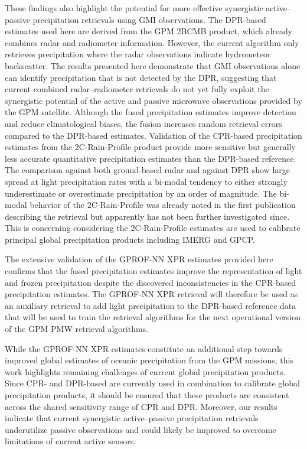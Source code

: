 \documentclass{ametsocV6.1}
\begin{document}
These findings also highlight the potential for more effective synergistic
active–passive precipitation retrievals using GMI observations. The DPR-based
estimates used here are derived from the GPM 2BCMB product, which already
combines radar and radiometer information. However, the current algorithm only
retrieves precipitation where the radar observations indicate hydrometeor
backscatter. The results presented here demonstrate that GMI observations alone
can identify precipitation that is not detected by the DPR, suggesting that
current combined radar–radiometer retrievals do not yet fully exploit the
synergistic potential of the active and passive microwave observations provided
by the GPM satellite. Although the fused precipitation estimates improve
detection and reduce climatological biases, the fusion increases random
retrieval errors compared to the DPR-based estimates. Validation of the
CPR-based precipitation estimates from the 2C-Rain-Profile product provide more
sensitive but generally less accurate quantitative precipitation estimates than
the DPR-based reference. The comparison against both ground-based radar and
against DPR show large spread at light precipitation rates with a bi-modal
tendency to either strongly underestimate or overestimate precipitation by an
order of magnitude. The bi-modal behavior of the 2C-Rain-Profile was already
noted in the first publication describing the retrieval but apparently has not
been further investigated since. This is concerning considering the
2C-Rain-Profile estimates are used to calibrate principal global precipitation
products including IMERG and GPCP.

The extensive validation of the GPROF-NN XPR estimates provided here confirms
that the fused precipitation estimates improve the representation of light and
frozen precipitation despite the discovered inconsistencies in the CPR-based
precipitation estimates. The GPROF-NN XPR retrieval will therefore be used as an
auxiliary retrieval to add light precipitation to the DPR-based reference data
that will be used to train the retrieval algorithms for the next operational
version of the GPM PMW retrieval algorithms.

While the GPROF-NN XPR estimates constitute an additional step towards improved
global estimates of oceanic precipitation from the GPM missions, this work
highlights remaining challenges of current global precipitation products. Since
CPR- and DPR-based are currently used in combination to calibrate global
precipitation products, it should be ensured that these products are consistent
across the shared sensitivity range of CPR and DPR. Moreover, our results
indicate that current synergistic active–passive precipitation retrievals
underutilize passive observations and could likely be improved to overcome
limitations of current active sensors.
\end{document}
